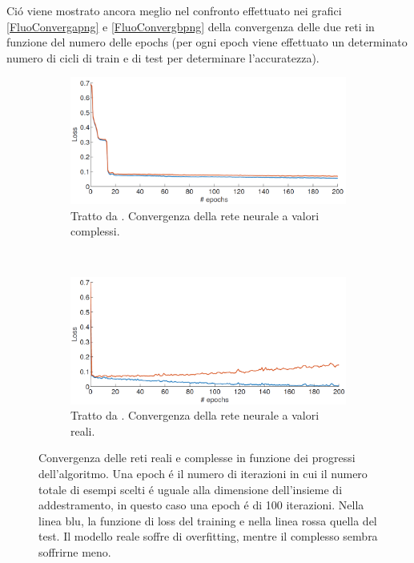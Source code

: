 \documentclass[a4paper,12pt]{report}
\begin{document}
 Ci\'o viene mostrato ancora meglio nel confronto effettuato nei grafici \ref{FluoConvergapng} e \ref{FluoConvergbpng} della convergenza delle due reti in funzione del numero delle epochs (per ogni epoch viene effettuato un determinato numero di cicli di train e di test per determinare l'accuratezza).
 \begin{figure}[h!]
  \centering
  \begin{subfigure}[b]{\linewidth}
   \includegraphics[scale=0.5]{FluoConverga.png}
   \caption{Tratto da \cite{guberman2016complex}. Convergenza della rete neurale a valori complessi.}
   \label{FluoConvergapgn}
  \end{subfigure}
  \\
  \begin{subfigure}[b]{\linewidth}
   \includegraphics[scale=0.5]{FluoConvergb.png}
   \caption{Tratto da \cite{guberman2016complex}. Convergenza della rete neurale a valori reali.}
   \label{FluoConvergbpgn}
  \end{subfigure}
  \caption{Convergenza delle reti reali e complesse in funzione dei progressi dell'algoritmo. Una epoch \'e il numero di iterazioni in cui il numero totale di esempi scelti \'e uguale alla dimensione dell'insieme di addestramento, in questo caso una epoch \'e di 100 iterazioni. Nella linea blu, la funzione di loss del training e nella linea rossa quella del test. Il modello reale soffre di overfitting, mentre il complesso sembra soffrirne meno.}
 \end{figure}
 
\end{document}
